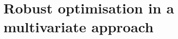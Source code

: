 \documentclass[../main.tex]{subfiles}
\begin{document}
\section{Robust optimisation in a multivariate approach}\label{sec4}
\end{document}
